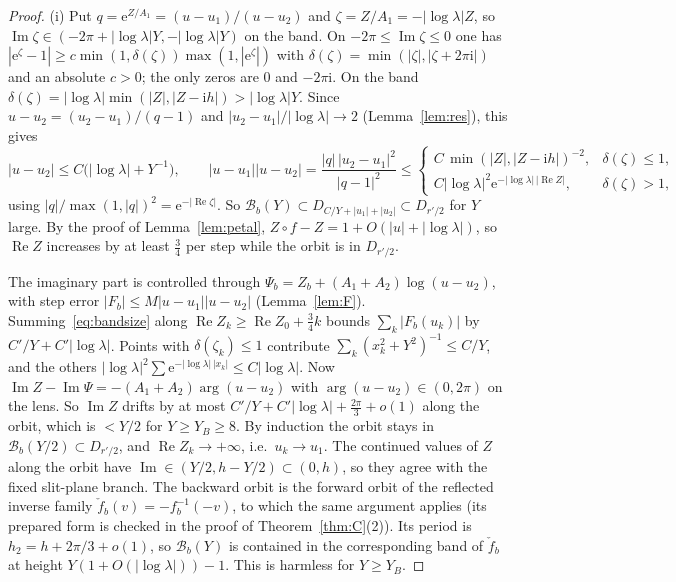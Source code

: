 \documentclass[11pt]{amsart}
\theoremstyle{definition}
\newcommand{\eee}{\mathrm{e}}
\newcommand{\ii}{\mathrm{i}}
\begin{document}
\begin{proof}
(i) Put $q=\eee^{Z/A_1}=(u-u_1)/(u-u_2)$ and $\zeta=Z/A_1=-|\log\lambda| Z$, so
$\operatorname{Im}\zeta\in(-2\pi+|\log\lambda| Y,-|\log\lambda| Y)$ on the band.  On
$-2\pi\le\operatorname{Im}\zeta\le0$ one has
$|\eee^\zeta-1|\ge c\min(1,\delta(\zeta))\max(1,|\eee^\zeta|)$ with
$\delta(\zeta)=\min(|\zeta|,|\zeta+2\pi\ii|)$ and an absolute $c>0$; the only
zeros are $0$ and $-2\pi\ii$.  On the band
$\delta(\zeta)=|\log\lambda|\min(|Z|,|Z-\ii h|)>|\log\lambda| Y$.  Since
$u-u_2=(u_2-u_1)/(q-1)$ and $|u_2-u_1|/|\log\lambda|\to2$
(Lemma~\ref{lem:res}), this gives
\begin{equation}\label{eq:bandsize}
 |u-u_2|\le C\bigl(|\log\lambda|+Y^{-1}\bigr),\qquad
 |u-u_1||u-u_2|=\frac{|q|\,|u_2-u_1|^2}{|q-1|^2}\le
 \begin{cases}C\,\min(|Z|,|Z-\ii h|)^{-2},&\delta(\zeta)\le1,\\
 C|\log\lambda|^2\eee^{-|\log\lambda|\,|\operatorname{Re}Z|},&\delta(\zeta)>1,\end{cases}
\end{equation}
using $|q|/\max(1,|q|)^2=\eee^{-|\operatorname{Re}\zeta|}$.  So
$\mathcal B_b(Y)\subset D_{C/Y+|u_1|+|u_2|}\subset D_{r'/2}$ for $Y$ large.  By the
proof of Lemma~\ref{lem:petal}, $Z\circ f-Z=1+O(|u|+|\log\lambda|)$, so
$\operatorname{Re}Z$ increases by at least $\tfrac34$ per step while the orbit is
in $D_{r'/2}$.

The imaginary part is controlled through
$\Psi_b=Z_b+(A_1+A_2)\log(u-u_2)$, with step error
$|F_b|\le M|u-u_1||u-u_2|$ (Lemma~\ref{lem:F}).  Summing~\eqref{eq:bandsize}
along $\operatorname{Re}Z_k\ge\operatorname{Re}Z_0+\tfrac34k$ bounds
$\sum_k|F_b(u_k)|$ by $C'/Y+C'|\log\lambda|$.  Points with
$\delta(\zeta_k)\le1$ contribute $\sum_k(x_k^2+Y^2)^{-1}\le C/Y$, and the others
$|\log\lambda|^2\sum\eee^{-|\log\lambda|\,|x_k|}\le C|\log\lambda|$.  Now
$\operatorname{Im}Z-\operatorname{Im}\Psi=-(A_1+A_2)\arg(u-u_2)$ with
$\arg(u-u_2)\in(0,2\pi)$ on the lens.  So $\operatorname{Im}Z$ drifts by at most
$C'/Y+C'|\log\lambda|+\tfrac{2\pi}3+o(1)$ along the orbit, which is $<Y/2$ for
$Y\ge Y_B\ge8$.  By induction the orbit stays in
$\mathcal B_b(Y/2)\subset D_{r'/2}$, and $\operatorname{Re}Z_k\to+\infty$,
i.e.\ $u_k\to u_1$.  The continued values of $Z$ along the orbit have
$\operatorname{Im}\in(Y/2,h-Y/2)\subset(0,h)$, so they agree with the fixed
slit-plane branch.  The backward orbit is the forward orbit of the reflected
inverse family $\check f_b(v)=-f_b^{-1}(-v)$, to which the same argument applies
(its prepared form is checked in the proof of Theorem~\ref{thm:C}(2)).  Its
period is $h_2=h+2\pi/3+o(1)$, so $\mathcal B_b(Y)$ is contained in the
corresponding band of $\check f_b$ at height $Y(1+O(|\log\lambda|))-1$.  This is harmless
for $Y\ge Y_B$.


\end{proof}
\end{document}
